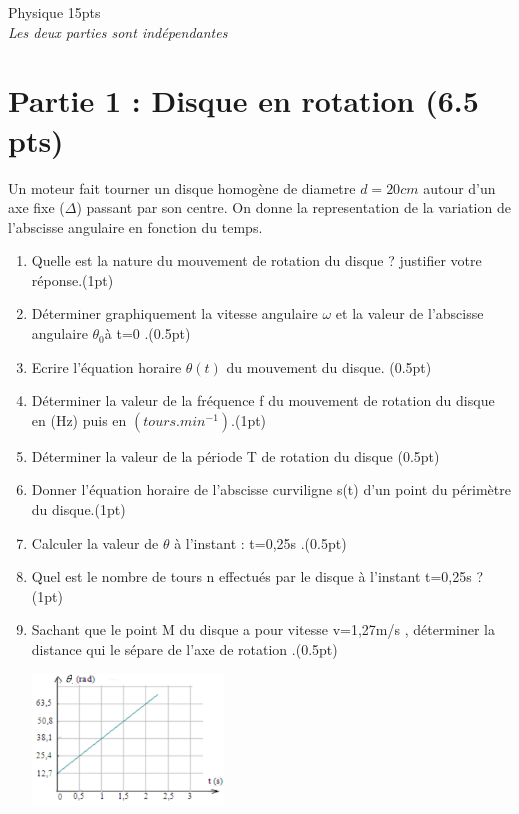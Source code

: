 \documentclass[12pt]{article}
\begin{document}
\begin{center}
    \vspace{.60cm}
\hrulefill
\Large{Physique 15pts}
\hrulefill\\
    \emph{Les deux parties sont indépendantes}
\end{center}

 \section*{Partie 1 : Disque en rotation (6.5 pts)}
Un moteur fait tourner un disque homogène de diametre $ d=20cm$ autour d’un axe fixe ($\Delta$) passant par son centre.
On donne la representation de la variation de l’abscisse angulaire en fonction du temps.


\begin{enumerate}
\begin{figure}
\end{figure}
    \item Quelle est la nature du mouvement de rotation du disque ? justifier votre réponse.\dotfill(1pt)
    \item Déterminer graphiquement la vitesse angulaire $ \omega$ et la valeur de l’abscisse angulaire $\theta_0$à t=0 .\dotfill(0.5pt)
    \item Ecrire l’équation horaire $\theta(t)$ du mouvement du disque. \dotfill(0.5pt)
    \item Déterminer la valeur de la fréquence f du mouvement de rotation du disque en (Hz) puis en $(tours.min^{-1})$.\dotfill(1pt)
    \item Déterminer la valeur de la période T de rotation du disque \dotfill(0.5pt)
    \item Donner l’équation horaire de l’abscisse curviligne s(t) d’un point du périmètre du disque.\dotfill(1pt)
    \item Calculer la valeur de $\theta$ à l’instant : t=0,25s .\dotfill(0.5pt)
    \item Quel est le nombre de tours n effectués par le disque à l’instant  t=0,25s ?\dotfill(1pt)
    \item Sachant que le point M du disque a pour vitesse v=1,27m/s , déterminer la distance qui le sépare de
l’axe de rotation .\dotfill(0.5pt)

\includegraphics[width=0.4\textwidth]{./img/imgf00.png}
\end{enumerate}
 
\end{document}
